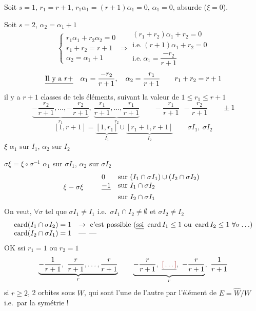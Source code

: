 \documentclass[11pt,a4paper]{article}
\begin{document}
Soit \struck{\ill{}} $s=1$, \struck{\ill{}} $r_1=r+1$,
$r_1\alpha_1=(r+1)\alpha_1=0$, $\alpha_1=0$, absurde ($\xi=0$).

Soit $s=2$, $\alpha_2=\alpha_1+1$
\[
  \begin{cases}
    r_1\alpha_1+r_2\alpha_2=0\\
    r_1+r_2=r+1\\
    \alpha_2=\alpha_1+1
  \end{cases}
  \Longrightarrow
  \begin{array}{l}
    (r_1+r_2)\alpha_1+r_2=0\\
    \text{i.e.}\ (r+1)\alpha_1+r_2=0\\
    \text{i.e.}\ \alpha_1=\dfrac{-r_2}{r+1}
  \end{array}
\]
\[
  \struck{\text{Il y a}\ r+}\quad
  \alpha_1=\frac{-r_2}{r+1},\quad\alpha_2=\frac{r_1}{r+1}\qquad
  r_1+r_2=r+1
\]
il y a $r+1$ classes de tels éléments, suivant la valeur de
$1\leq r_1\leq r+1$
\[
  \underbrace{-\frac{r_2}{r+1},\ldots,-\frac{r_2}{r+1}}_{r_1},\
  \underbrace{\frac{r_1}{r+1},\ldots,\frac{r_1}{r+1}}_{r_2}
  \qquad
  -\frac{r_1}{r+1}\ \ -\frac{r_2}{r+1}\qquad\pm1
\]
\[
  [1,r+1]=\underbrace{[1,r_1]}_{I_1}\cup
  \underbrace{[r_1+1,r+1]}_{I_2}
  \qquad \sigma I_1,\ \sigma I_2
\]
$\xi$ \quad $\alpha_1$ sur $I_1$, $\alpha_2$ sur $I_2$

$\sigma\xi=\xi\circ\sigma^{-1}$ \quad $\alpha_1$ sur $\sigma I_1$, $\alpha_2$
sur $\sigma I_2$
\[
  \xi-\sigma\xi\qquad
  \begin{array}{ll}
    0 & \text{sur}\ (I_1\cap\sigma I_1)\cup(I_2\cap\sigma I_2)\\
    \struck{-1} & \text{sur}\ I_1\cap\sigma I_2\\
    & \text{sur}\ I_2\cap\sigma I_1
  \end{array}
\]
On veut, $\forall\sigma$ tel que $\sigma I_1\neq I_1$ \struck{\ill{}}
i.e.\ $\sigma I_1\cap I_2\neq\emptyset$  et $\sigma I_2\neq I_2$
\struck{$I_1\cap\sigma I_2$}
\[
\begin{array}{ll}
  \operatorname{card}(I_1\cap\sigma I_2)=1 &
    \to\ \text{c'est possible (\uncertain{ssi}}\
    \operatorname{card}I_1\leq1\ \text{ou}\ \operatorname{card}I_2\leq1\
    \forall\sigma\ldots)\\
  \operatorname{card}(I_2\cap\sigma I_1)=1 & \text{--- \,--- }
\end{array}
\]
\struck{Donc} OK ssi $r_1=1$ ou $r_2=1$
\[
  \underbrace{-\frac{1}{r+1},\ \frac{r}{r+1},\ldots,\frac{r}{r+1}}_{r}
  \qquad
  \underbrace{-\frac{r}{r+1},\ \struck{\ill{}},\ -\frac{r}{r+1}}_{r},\
  \frac{1}{r+1}
\]
si $r\geq2$, 2 orbites sous $W$, qui sont \struck{\ill{}}
\add{échangées} l'une de l'autre par \struck{\ill{}} l'élément
\struck{\ill{}} \ill{} de $E=\hat W/W$ i.e.\ par la symétrie !
\end{document}
